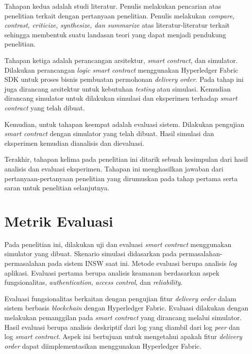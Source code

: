 Tahapan kedua adalah studi literatur. Penulis melakukan pencarian atas penelitian terkait dengan pertanyaan penelitian. Penulis melakukan \textit{compare, contrast, criticize, synthesize, dan summarize} atas literatur-literatur terkait sehingga membentuk suatu landasan teori yang dapat menjadi pendukung penelitian. 

Tahapan ketiga adalah perancangan arsitektur, \textit{smart contract}, dan simulator. Dilakukan perancangan \textit{logic} \textit{smart contract} menggunakan Hyperledger Fabric SDK untuk proses bisnis pembuatan permohonan \textit{delivery order}. Pada tahap ini juga dirancang arsitektur untuk kebutuhan \textit{testing} atau simulasi. Kemudian dirancang simulator untuk dilakukan simulasi dan eksperimen terhadap \textit{smart contract} yang telah dibuat.

Kemudian, untuk tahapan keempat adalah evaluasi sistem. Dilakukan pengujian \textit{smart contract} dengan simulator yang telah dibuat. Hasil simulasi dan eksperimen kemudian dianalisis dan dievaluasi.

Terakhir, tahapan kelima pada penelitian ini ditarik sebuah kesimpulan dari hasil analisis dan evaluasi eksperimen. Tahapan ini menghasilkan jawaban dari pertanyaan-pertanyaan penelitian yang dirumuskan pada tahap pertama serta saran untuk penelitian selanjutnya.


\section{Metrik Evaluasi}
\label{sec:metrikevaluasi}

Pada penelitian ini, dilakukan uji dan evaluasi \textit{smart contract} menggunakan simulator yang dibuat. Skenario simulasi didasarkan pada permasalahan-permasalahan pada sistem INSW saat ini. Metode evaluasi berupa analisis \textit{log} aplikasi. Evaluasi pertama berupa analisis keamanan berdasarkan aspek fungsionalitas, \textit{authentication}, \textit{access control}, dan \textit{reliability}.

Evaluasi fungsionalitas berkaitan dengan pengujian fitur \textit{delivery order} dalam sistem berbasis \textit{blockchain} dengan Hyperledger Fabric. Evaluasi dilakukan dengan melakukan pemanggilan pada \textit{smart contract} yang dirancang melalui simulator. Hasil evaluasi berupa analisis deskriptif dari log yang diambil dari log \textit{peer} dan log \textit{smart contract}. Aspek ini bertujuan untuk mengetahui apakah fitur \textit{delivery order} dapat diimplementasikan menggunakan Hyperledger Fabric.

